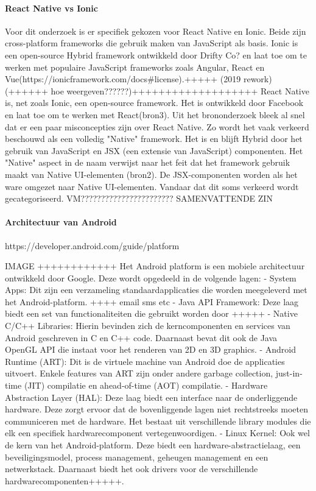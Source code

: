 \paragraph{React Native vs Ionic}
\newline
Voor dit onderzoek is er specifiek gekozen voor React Native en Ionic. Beide zijn cross-platform frameworks die gebruik maken van JavaScript als basis. Ionic is een open-source Hybrid framework ontwikkeld door Drifty Co? en laat toe om te werken met populaire JavaScript frameworks zoals Angular, React en Vue(https://ionicframework.com/docs#license).+++++ (2019 rework) (++++++ hoe weergeven??????)+++++++++++++++++++
React Native is, net zoals Ionic, een open-source framework. Het is ontwikkeld door Facebook en laat toe om te werken met React(bron3). Uit het brononderzoek bleek al snel dat er een paar misconcepties zijn over React Native. Zo wordt het vaak verkeerd beschouwd als een volledig "Native" framework. Het is en blijft Hybrid door het gebruik van JavaScript en JSX (een extensie van JavaScript) componenten. Het "Native" aspect in de naam verwijst naar het feit dat het framework gebruik maakt van Native UI-elementen (bron2). De JSX-componenten worden als het ware omgezet naar Native UI-elementen. Vandaar dat dit soms verkeerd wordt gecategoriseerd.
VM???????????????????????
SAMENVATTENDE ZIN

\paragraph{Architectuur van Android}
\newline
https://developer.android.com/guide/platform

IMAGE
++++++++++++
Het Android platform is een mobiele architectuur ontwikkeld door Google. Deze wordt opgedeeld in de volgende lagen:
  - System Apps: Dit zijn een verzameling standaardapplicaties die worden meegeleverd met het Android-platform. ++++ email sms etc 
  - Java API Framework: Deze laag biedt een set van functionaliteiten die gebruikt worden door +++++
  - Native C/C++ Libraries: Hierin bevinden zich de kerncomponenten en services van Android geschreven in C en C++ code. Daarnaast bevat dit ook de Java OpenGL API die instaat voor het renderen van 2D en 3D graphics.
  - Android Runtime (ART): Dit is de virtuele machine van Android doe de applicaties uitvoert. Enkele features van ART zijn onder andere garbage collection, just-in-time (JIT) compilatie en ahead-of-time (AOT) compilatie.
  - Hardware Abstraction Layer (HAL): Deze laag biedt een interface naar de onderliggende hardware. Deze zorgt ervoor dat de bovenliggende lagen niet rechtstreeks moeten communiceren met de hardware. Het bestaat uit verschillende library modules die elk een specifiek hardwarecomponent vertegenwoordigen.
  - Linux Kernel: Ook wel de kern van het Android-platform. Deze biedt een hardware-abstractielaag, een beveiligingsmodel, process management, geheugen management en een netwerkstack. Daarnaast biedt het ook drivers voor de verschillende hardwarecomponenten+++++.



